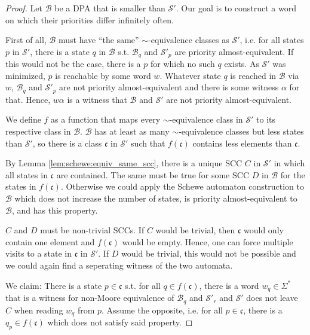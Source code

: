 \begin{proof}
	Let $\mathcal{B}$ be a DPA that is smaller than $\mathcal{S}'$. Our goal is to construct a word on which their priorities differ infinitely often.
	
	First of all, $\mathcal{B}$ must have \enquote{the same} $\sim$-equivalence classes as $\mathcal{S}'$, i.e. for all states $p$ in $\mathcal{S}'$, there is a state $q$ in $\mathcal{B}$ s.t. $\mathcal{B}_q$ and $\mathcal{S}'_p$ are priority almost-equivalent. If this would not be the case, there is a $p$ for which no such $q$ exists. As $\mathcal{S}'$ was minimized, $p$ is reachable by some word $w$. Whatever state $q$ is reached in $\mathcal{B}$ via $w$, $\mathcal{B}_q$ and $\mathcal{S}'_p$ are not priority almost-equivalent and there is some witness $\alpha$ for that. Hence, $w \alpha$ is a witness that $\mathcal{B}$ and $\mathcal{S}'$ are not priority almost-equivalent.
	
	We define $f$ as a function that maps every $\sim$-equivalence class in $\mathcal{S}'$ to its respective class in $\mathcal{B}$. $\mathcal{B}$ has at least as many $\sim$-equivalence classes but less states than $\mathcal{S}'$, so there is a class $\mathfrak{c}$ in $\mathcal{S}'$ such that $f(\mathfrak{c})$ contains less elements than $\mathfrak{c}$.
	
	By Lemma \ref{lem:schewe:equiv_same_scc}, there is a unique SCC $C$ in $\mathcal{S}'$ in which all states in $\mathfrak{c}$ are contained. The same must be true for some SCC $D$ in $\mathcal{B}$ for the states in $f(\mathfrak{c})$. Otherwise we could apply the Schewe automaton construction to $\mathcal{B}$ which does not increase the number of states, is priority almost-equivalent to $\mathcal{B}$, and has this property.
	
	$C$ and $D$ must be non-trivial SCCs. If $C$ would be trivial, then $\mathfrak{c}$ would only contain one element and $f(\mathfrak{c})$ would be empty. Hence, one can force multiple visits to a state in $\mathfrak{c}$ in $\mathcal{S}'$. If $D$ would be trivial, this would not be possible and we could again find a seperating witness of the two automata.
	
	We claim: There is a state $p \in \mathfrak{c}$ s.t. for all $q \in f(\mathfrak{c})$, there is a word $w_q \in \Sigma^*$ that is a witness for non-Moore equivalence of $\mathcal{B}_q$ and $\mathcal{S}'_r$ and $\mathcal{S}'$ does not leave $C$ when reading $w_q$ from $p$. Assume the opposite, i.e. for all $p \in \mathfrak{c}$, there is a $q_p \in f(\mathfrak{c})$ which does not satisfy said property. 
	

\end{proof}
